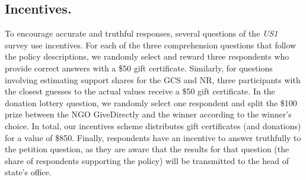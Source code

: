 \documentclass{nature}
\begin{document}
\begin{methods}
\subsection{\small Incentives.} %
To encourage accurate and truthful responses, several questions of the \textit{US1} survey use incentives. For each of the three comprehension questions that follow the policy descriptions, we randomly select and reward three respondents who provide correct answers with a \$50 gift certificate. Similarly, for questions involving estimating support shares for the GCS and NR, three participants with the closest guesses to the actual values receive a \$50 gift certificate. In the donation lottery question, we randomly select one respondent and split the \$100 prize between the NGO GiveDirectly and the winner according to the winner's choice. In total, our incentives scheme distributes gift certificates (and donations) for a value of \$850. Finally, respondents have an incentive to answer truthfully to the petition question, as they are aware that the results for that question (the share of respondents supporting the policy) will be transmitted to the head of state's office.







\end{methods}
\end{document}
